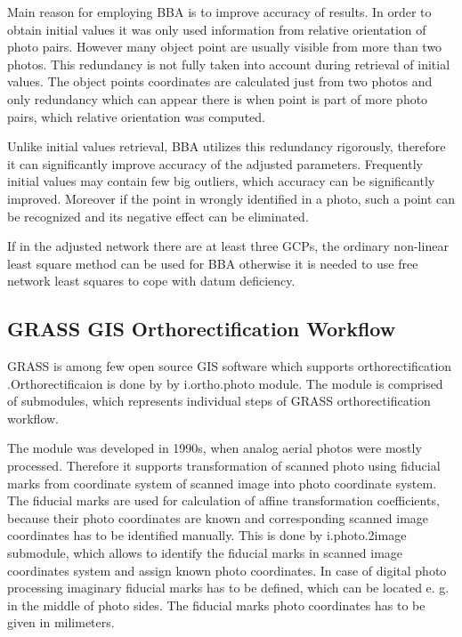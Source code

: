\documentclass[a4paper,12pt]{article}
\begin{document}
Main reason for employing BBA is to improve accuracy of results.
In order to obtain initial values it was only used information from relative orientation of photo pairs.
However many object point are usually visible from more than two photos. This redundancy is not fully taken 
into account during retrieval of initial values. The object points coordinates are calculated 
just from two photos and only redundancy which can appear there is when point is part of more 
photo pairs, which relative orientation was computed. 

Unlike initial values retrieval, BBA utilizes this redundancy rigorously, therefore 
it can significantly improve accuracy of the adjusted parameters.
Frequently initial values may contain few big outliers, which accuracy can be significantly improved.
Moreover if the point in wrongly identified in a photo, such a point can be recognized and its 
negative effect can be eliminated.


If in the adjusted network there are at least three GCPs, the ordinary non-linear least square method \label{sec:non_least} 
can be used for BBA otherwise
it is needed to use free network least squares \label{sec:free_net_least} to cope with datum deficiency. 

\subsection{GRASS GIS Orthorectification Workflow}

GRASS is among few open source GIS software which supports orthorectification
\cite{rocchini2012robust}.Orthorectificaion is done by 
by i.ortho.photo \cite{i.ortho.photo} module.
The module is comprised of submodules, which represents individual steps of 
GRASS orthorectification workflow.


The module was developed in 1990s,  
when analog aerial photos were mostly processed. Therefore it supports 
 transformation of scanned photo using fiducial marks from coordinate system of scanned image into 
 photo coordinate system. The fiducial marks are used for calculation of 
 affine transformation coefficients, because their photo coordinates are known 
 and corresponding scanned image coordinates has to be identified manually. 
 This is done by i.photo.2image submodule, which allows to identify the fiducial 
 marks in scanned image coordinates system and assign known photo coordinates.
  In case of digital photo processing imaginary fiducial marks has to be defined, which
can be located e. g. in the middle of photo sides. The fiducial marks 
photo coordinates has to be given in milimeters. 
  
\end{document}
